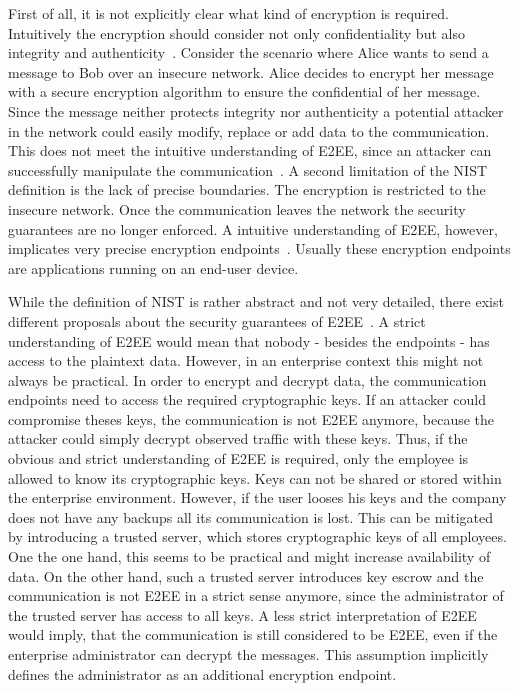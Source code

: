 \documentclass[../main.tex]{subfiles}
\begin{document}
First of all, it is not explicitly clear what kind of encryption is required.
Intuitively the encryption should consider not only confidentiality but also integrity and authenticity~\cite{Hale2022}.
Consider the scenario where Alice wants to send a message to Bob over an insecure network.
Alice decides to encrypt her message with a secure encryption algorithm to ensure the confidential of her message.
Since the message neither protects integrity nor authenticity a potential attacker in the network could easily modify, replace or add data to the communication.
This does not meet the intuitive understanding of E2EE, since an attacker can successfully manipulate the communication~\cite{Hale2022}.
A second limitation of the NIST definition is the lack of precise boundaries. 
The encryption is restricted to the insecure network.
Once the communication leaves the network the security guarantees are no longer enforced.
A intuitive understanding of E2EE, however, implicates very precise encryption endpoints~\cite{Hale2022}.
Usually these encryption endpoints are applications running on an end-user device.





While the definition of NIST is rather abstract and not very detailed, there exist different proposals about the security guarantees of E2EE~\cite{Hale2022}.
A strict understanding of E2EE would mean that nobody - besides the endpoints - has access to the plaintext data.
However, in an enterprise context this might not always be practical.
In order to encrypt and decrypt data, the communication endpoints need to access the required cryptographic keys.
If an attacker could compromise theses keys, the communication is not E2EE anymore, because the attacker could simply decrypt observed traffic with these keys.
Thus, if the obvious and strict understanding of E2EE is required, only the employee is allowed to know its cryptographic keys.
Keys can not be shared or stored within the enterprise environment.
However, if the user looses his keys and the company does not have any backups all its communication is lost.
This can be mitigated by introducing a trusted server, which stores cryptographic keys of all employees.
One the one hand, this seems to be practical and might increase availability of data. 
On the other hand, such a trusted server introduces key escrow and the communication is not E2EE in a strict sense anymore, since the administrator of the trusted server has access to all keys.
A less strict interpretation of E2EE would imply, that the communication is still considered to be E2EE, even if the enterprise administrator can decrypt the messages.
This assumption implicitly defines the administrator as an additional encryption endpoint. 
\end{document}
